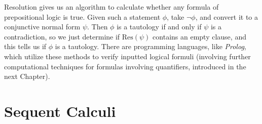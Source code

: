 Resolution gives us an algorithm to calculate whether any formula of prepositional logic is true. Given such a statement $\phi$, take $\neg \phi$, and convert it to a conjunctive normal form $\psi$. Then $\phi$ is a tautology if and only if $\psi$ is a contradiction, so we just determine if $\text{Res}(\psi)$ contains an empty clause, and this tells us if $\phi$ is a tautology. There are programming languages, like \emph{Prolog}, which utilize these methods to verify inputted logical formuli (involving further computational techniques for formulas involving quantifiers, introduced in the next Chapter).

\section{Sequent Calculi}

